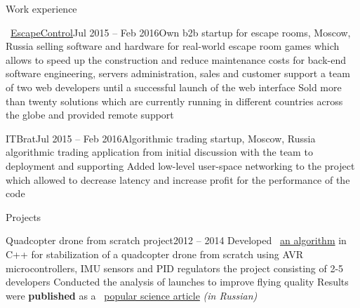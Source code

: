 \documentclass{resume} %
\newcommand{\mylink}{{\color{gray}\faExternalLink}}
\begin{document}
\begin{rSection}{Work experience}
	
	\begin{rSubsection}{\mylink~\href{http://escape-control.com}{EscapeControl}}{Jul 2015 -- Feb 2016}{Own b2b startup for escape rooms, Moscow, Russia}{}
		 selling software and hardware for real-world escape room games which allows to speed up the construction and reduce maintenance costs
		 for back-end software engineering, servers administration, sales and customer support
		 a team of two web developers until a successful launch of the web interface
		\myitem Sold more than twenty solutions which are currently running in different countries across the globe and provided remote support
	\end{rSubsection}
	
	\begin{rSubsection}{ITBrat}{Jul 2015 -- Feb 2016}{Algorithmic trading startup, Moscow, Russia}{}
		 algorithmic trading application from initial discussion with the team to deployment and supporting
		\myitem Added low-level user-space networking to the project which allowed to decrease latency and increase profit
		 for the performance of the code
	\end{rSubsection}
	
	
\end{rSection}

\begin{rSection}{Projects}
	\begin{rSubsection}{Quadcopter drone from scratch project}{2012 -- 2014}{}{}
		\myitem Developed \mylink~\href{https://github.com/it-workshop/Quadrocopter}{an algorithm} in C++ for stabilization of a quadcopter drone from scratch using AVR microcontrollers, IMU sensors and PID regulators
		 the project consisting of 2-5 developers
		\myitem Conducted the analysis of launches to improve flying quality
		\myitem Results were {\bf published} as a \mylink~\href{http://web.archive.org/web/20141016114551/http://habrahabr.ru/company/technoworks/blog/216437/}{popular science article} {\em (in Russian)}
	\end{rSubsection}
\end{rSection}
\end{document}
